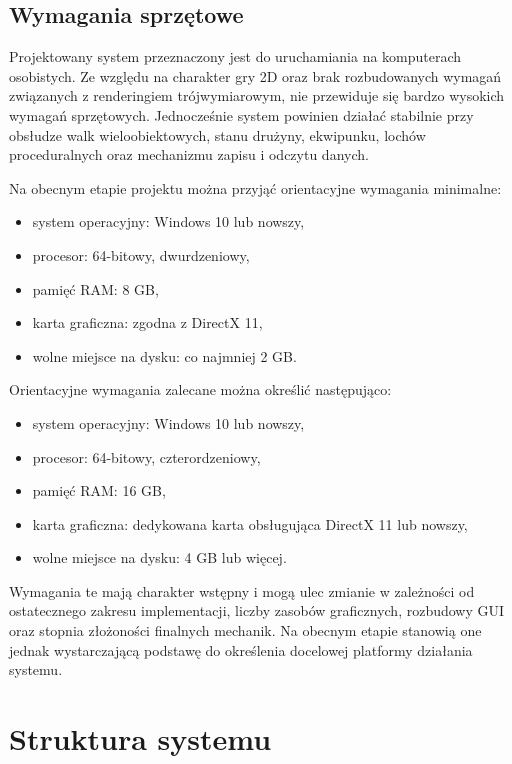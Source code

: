 \subsection{Wymagania sprzętowe}
\label{subsec:wymagania-sprzetowe}

Projektowany system przeznaczony jest do uruchamiania na komputerach osobistych. Ze względu na charakter gry 2D oraz brak rozbudowanych wymagań związanych z renderingiem trójwymiarowym, nie przewiduje się bardzo wysokich wymagań sprzętowych. Jednocześnie system powinien działać stabilnie przy obsłudze walk wieloobiektowych, stanu drużyny, ekwipunku, lochów proceduralnych oraz mechanizmu zapisu i odczytu danych.

Na obecnym etapie projektu można przyjąć orientacyjne wymagania minimalne:
\begin{itemize}
    \item system operacyjny: Windows 10 lub nowszy,
    \item procesor: 64-bitowy, dwurdzeniowy,
    \item pamięć RAM: 8 GB,
    \item karta graficzna: zgodna z DirectX 11,
    \item wolne miejsce na dysku: co najmniej 2 GB.
\end{itemize}

Orientacyjne wymagania zalecane można określić następująco:
\begin{itemize}
    \item system operacyjny: Windows 10 lub nowszy,
    \item procesor: 64-bitowy, czterordzeniowy,
    \item pamięć RAM: 16 GB,
    \item karta graficzna: dedykowana karta obsługująca DirectX 11 lub nowszy,
    \item wolne miejsce na dysku: 4 GB lub więcej.
\end{itemize}

Wymagania te mają charakter wstępny i mogą ulec zmianie w zależności od ostatecznego zakresu implementacji, liczby zasobów graficznych, rozbudowy GUI oraz stopnia złożoności finalnych mechanik. Na obecnym etapie stanowią one jednak wystarczającą podstawę do określenia docelowej platformy działania systemu.

\section{Struktura systemu}
\label{sec:struktura-systemu}

